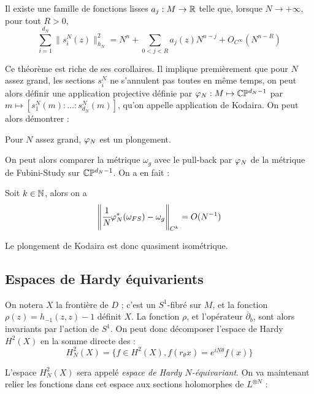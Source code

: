 \begin{theorem}[Zelditch] Il existe une famille de fonctions lisses $a_j : M \to \mathbb{R}$ telle que, lorsque $N \to +\infty$, pour tout $R>0$,  
	\begin{equation*}
	\sum_{i=1}^{d_N}\|s^N_i(z)\|^2_{h_N} = N^n + \sum_{0 < j < R} a_j(z)N^{n-j} + O_{C^{\infty}}(N^{n-R})
	\end{equation*}
\end{theorem}

Ce théorème est riche de ses corollaires. Il implique premièrement que pour $N$ assez grand, les sections $s^N_i$ ne s'annulent pas toutes en même temps, on peut alors définir une application projective définie par $\varphi_N : M \mapsto \mathbb{C}\mathbb{P}^{d_N-1}$ par $m \mapsto [s^N_1(m) : \ldots : s^N_{d_N}(m)]$, qu'on appelle application de Kodaira. On peut alors démontrer :
\begin{theorem}[Kodaira] \cite{fritzsche} Pour $N$ assez grand, $\varphi_N$ est un plongement. \end{theorem}

On peut alors comparer la métrique $\omega_g$ avec le pull-back par $\varphi_N$ de la métrique de Fubini-Study sur $\mathbb{C}\mathbb{P}^{d_N-1}$. On a en fait :

\begin{theorem}[Tian] \cite{tian1990set} Soit $k \in \mathbb{N}$, alors on a \begin{equation*}
\left\|\cfrac1N \varphi_N^*(\omega_{FS}) - \omega_g \right\|_{C^{k}} = O(N^{-1})
\end{equation*}\end{theorem}

Le plongement de Kodaira est donc quasiment isométrique.

\subsection{Espaces de Hardy équivarients}

On notera $X$ la frontière de $D$ ; c'est un $S^1$-fibré sur $M$, et la fonction $\rho(z)=h_{-1}(z,z)-1$ définit $X$. La fonction $\rho$, et l'opérateur $\overline{\partial}_b$, sont alors invariants par l'action de $S^1$. On peut donc décomposer l'espace de Hardy $H^2(X)$ en la somme directe des :
\begin{equation*}
	H^2_N(X)=\{f \in H^2(X), f(r_{\theta}x) = e^{iN\theta}f(x)\}
\end{equation*}

L'espace $H^2_N(X)$ sera appelé \emph{espace de Hardy $N$-équivariant}. On va maintenant relier les fonctions dans cet espace aux sections holomor\-phes de $L^{\otimes N}$ :

